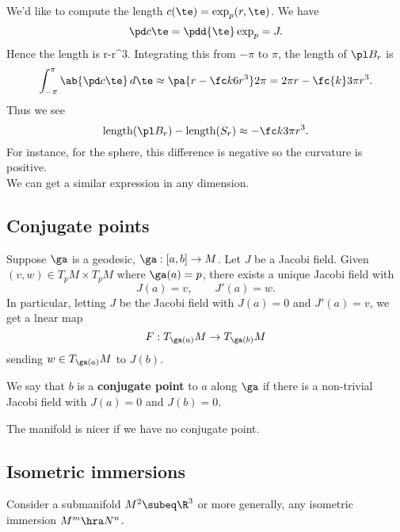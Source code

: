 We'd like to compute the length $c(\te)=\exp_p(r,\te)$. We have
\[
\pd c{\te}=\pdd{\te} \exp_p=J.
\]
Hence the length is
\approx r-r^3.
\eeq
Integrating this from $-\pi$ to $\pi$, the length of $\pl B_r$ is
\[
\int_{-\pi}^{\pi} \ab{\pd c{\te}}\,d\te\approx \pa{r-\fc k6 r^3}2\pi =2\pi r-\fc{k}3\pi r^3.
\]
Thus we see
\[
\text{length}(\pl B_r)-\text{length}(S_r)\approx -\fc k3\pi r^3.
\]
For instance, for the sphere, this difference is negative so the curvature is positive.\\

\vskip0.15in
We can get a similar expression in any dimension. %

\subsection{Conjugate points}
Suppose $\ga$ is a geodesic, $\ga:[a,b]\to M$. Let $J$ be a Jacobi field. Given $(v,w)\in T_pM\times T_pM$ where $\ga(a)=p$, there exists a unique Jacobi field with
\[
J(a)=v,\qquad J'(a)=w.
\]
In particular, letting $J$ be the Jacobi field with $J(a)=0$ and $J'(a)=v$, we get a lnear map 
\[F:T_{\ga(a)}M\to T_{\ga(b)} M
\] sending $w\in T_{\ga(a)}M$ to $J(b)$.
\begin{df}
We say that $b$ is a \textbf{conjugate point}  to $a$ along $\ga$ if there is a non-trivial Jacobi field with $J(a)=0$ and $J(b)=0$.
\end{df}

The manifold is nicer if we have no conjugate point. %


\subsection{Isometric immersions}
Consider a submanifold $M^2\subeq \R^3$ or more generally, any isometric immersion $M^m\hra N^n$. %

